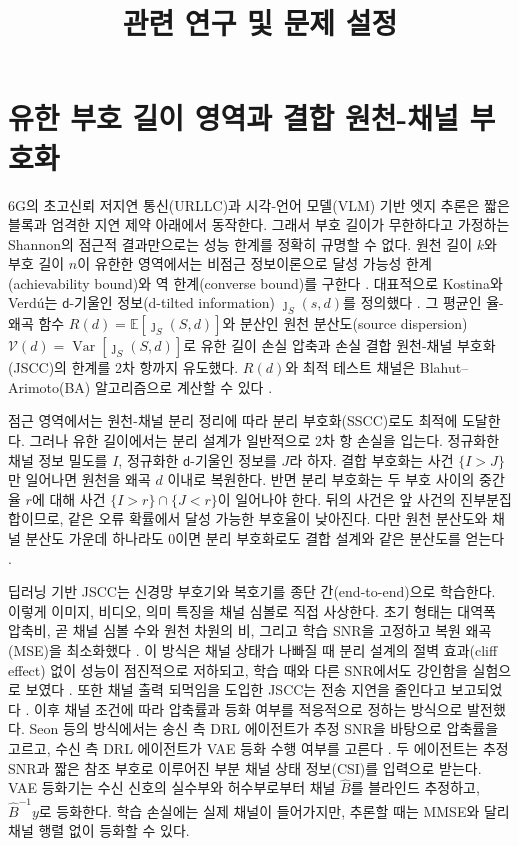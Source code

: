 \documentclass[11pt,a4paper]{article}
\title{관련 연구 및 문제 설정}
\author{}
\date{}
\newcommand{\E}{\mathbb{E}}
\begin{document}
\maketitle
\vspace{-3em}

\section{유한 부호 길이 영역과 결합 원천-채널 부호화}

6G의 초고신뢰 저지연 통신(URLLC)과 시각-언어 모델(VLM) 기반 엣지 추론은 짧은 블록과 엄격한 지연 제약 아래에서 동작한다. 그래서 부호 길이가 무한하다고 가정하는 Shannon의 점근적 결과만으로는 성능 한계를 정확히 규명할 수 없다. 원천 길이 $k$와 부호 길이 $n$이 유한한 영역에서는 비점근 정보이론으로 달성 가능성 한계(achievability bound)와 역 한계(converse bound)를 구한다 \cite{gao2025fbl}. 대표적으로 Kostina와 Verdú는 $\mathsf{d}$-기울인 정보(d-tilted information) $\jmath_S(s,d)$를 정의했다 \cite{kostina2012, kostina2013}. 그 평균인 율-왜곡 함수 $R(d)=\E[\jmath_S(S,d)]$와 분산인 원천 분산도(source dispersion) $\mathcal{V}(d)=\operatorname{Var}[\jmath_S(S,d)]$로 유한 길이 손실 압축과 손실 결합 원천-채널 부호화(JSCC)의 한계를 2차 항까지 유도했다. $R(d)$와 최적 테스트 채널은 Blahut--Arimoto(BA) 알고리즘으로 계산할 수 있다 \cite{blahut1972, arimoto1972}.

점근 영역에서는 원천-채널 분리 정리에 따라 분리 부호화(SSCC)로도 최적에 도달한다. 그러나 유한 길이에서는 분리 설계가 일반적으로 2차 항 손실을 입는다. 정규화한 채널 정보 밀도를 $I$, 정규화한 $\mathsf{d}$-기울인 정보를 $J$라 하자. 결합 부호화는 사건 $\{I>J\}$만 일어나면 원천을 왜곡 $d$ 이내로 복원한다. 반면 분리 부호화는 두 부호 사이의 중간 율 $r$에 대해 사건 $\{I>r\}\cap\{J<r\}$이 일어나야 한다. 뒤의 사건은 앞 사건의 진부분집합이므로, 같은 오류 확률에서 달성 가능한 부호율이 낮아진다. 다만 원천 분산도와 채널 분산도 가운데 하나라도 0이면 분리 부호화로도 결합 설계와 같은 분산도를 얻는다 \cite{gao2025fbl}.

딥러닝 기반 JSCC는 신경망 부호기와 복호기를 종단 간(end-to-end)으로 학습한다. 이렇게 이미지, 비디오, 의미 특징을 채널 심볼로 직접 사상한다. 초기 형태는 대역폭 압축비, 곧 채널 심볼 수와 원천 차원의 비, 그리고 학습 SNR을 고정하고 복원 왜곡(MSE)을 최소화했다 \cite{bourtsoulatze2019}. 이 방식은 채널 상태가 나빠질 때 분리 설계의 절벽 효과(cliff effect) 없이 성능이 점진적으로 저하되고, 학습 때와 다른 SNR에서도 강인함을 실험으로 보였다 \cite{bourtsoulatze2019}. 또한 채널 출력 되먹임을 도입한 JSCC는 전송 지연을 줄인다고 보고되었다 \cite{gao2025fbl}. 이후 채널 조건에 따라 압축률과 등화 여부를 적응적으로 정하는 방식으로 발전했다. Seon 등의 방식에서는 송신 측 DRL 에이전트가 추정 SNR을 바탕으로 압축률을 고르고, 수신 측 DRL 에이전트가 VAE 등화 수행 여부를 고른다 \cite{seon2025}. 두 에이전트는 추정 SNR과 짧은 참조 부호로 이루어진 부분 채널 상태 정보(CSI)를 입력으로 받는다. VAE 등화기는 수신 신호의 실수부와 허수부로부터 채널 $\hat B$를 블라인드 추정하고, $\hat B^{-1}y$로 등화한다. 학습 손실에는 실제 채널이 들어가지만, 추론할 때는 MMSE와 달리 채널 행렬 없이 등화할 수 있다.
\end{document}
